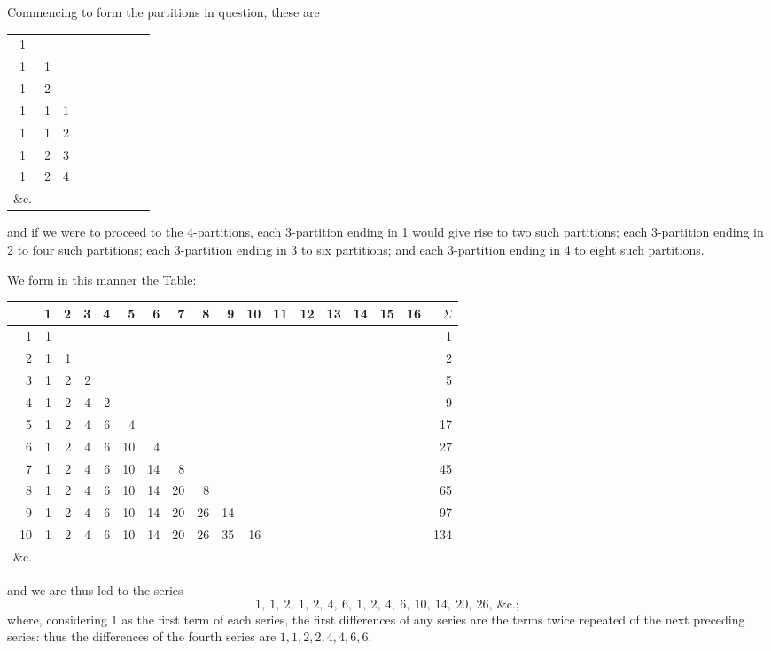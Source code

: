 \documentclass[11pt,a4paper]{article}
\theoremstyle{plain}
\begin{document}
Commencing to form the partitions in question, these are
\begin{center}
\begin{tabular}{ccccccccc}
1 & & & & & & & & \\
1 & 1 & & & & & & & \\
1 & 2 & & & & & & & \\
1 & 1 & 1 & & & & & & \\
1 & 1 & 2 & & & & & & \\
1 & 2 & 3 & & & & & & \\
1 & 2 & 4 & & & & & & \\
\&c. & & & & & & & 
\end{tabular}
\end{center}
and if we were to proceed to the 4-partitions, each 3-partition ending in 1 would give rise to two such partitions; each 3-partition ending in 2 to four such partitions; each 3-partition ending in 3 to six partitions; and each 3-partition ending in 4 to eight such partitions.

We form in this manner the Table:
\begin{center}
\begin{tabular}{r|rrrrrrrrrrrrrrrr|r}
& 1 & 2 & 3 & 4 & 5 & 6 & 7 & 8 & 9 & 10 & 11 & 12 & 13 & 14 & 15 & 16 & $\Sigma$ \\
\hline
1 & 1 & & & & & & & & & & & & & & & & 1 \\
2 & 1 & 1 & & & & & & & & & & & & & & & 2 \\
3 & 1 & 2 & 2 & & & & & & & & & & & & & & 5 \\
4 & 1 & 2 & 4 & 2 & & & & & & & & & & & & & 9 \\
5 & 1 & 2 & 4 & 6 & 4 & & & & & & & & & & & & 17 \\
6 & 1 & 2 & 4 & 6 & 10 & 4 & & & & & & & & & & & 27 \\
7 & 1 & 2 & 4 & 6 & 10 & 14 & 8 & & & & & & & & & & 45 \\
8 & 1 & 2 & 4 & 6 & 10 & 14 & 20 & 8 & & & & & & & & & 65 \\
9 & 1 & 2 & 4 & 6 & 10 & 14 & 20 & 26 & 14 & & & & & & & & 97 \\
10 & 1 & 2 & 4 & 6 & 10 & 14 & 20 & 26 & 35 & 16 & & & & & & & 134 \\
\&c. & & & & & & & & & & & & & & & & 
\end{tabular}
\end{center}
and we are thus led to the series
\[
1,\ 1,\ 2,\ 1,\ 2,\ 4,\ 6,\ 1,\ 2,\ 4,\ 6,\ 10,\ 14,\ 20,\ 26,\ \&\text{c.};
\]
where, considering 1 as the first term of each series, the first differences of any series are the terms twice repeated of the next preceding series: thus the differences of the fourth series are $1, 1, 2, 2, 4, 4, 6, 6$.
\end{document}
